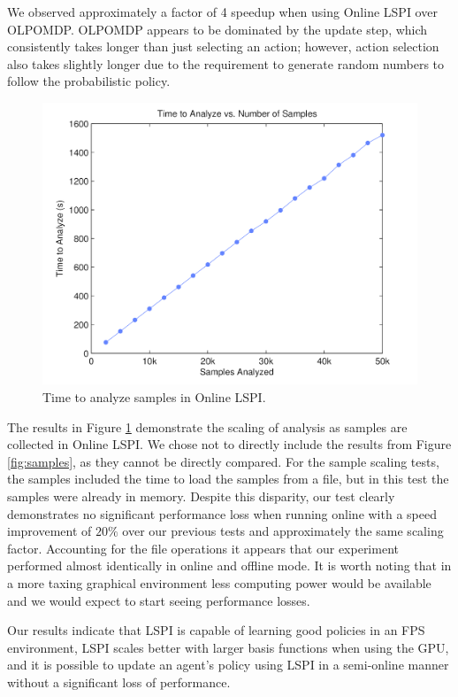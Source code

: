 We observed approximately a factor of 4 speedup when using Online LSPI over OLPOMDP. OLPOMDP appears to be dominated by the update step, which consistently takes longer than just selecting an action; however, action selection also takes slightly longer due to the requirement to generate random numbers to follow the probabilistic policy.

\begin{figure}
	\centering
		\includegraphics[height=0.33\paperheight]{Online_Time_vs_Samples.png}
	\caption{Time to analyze samples in Online LSPI.}
	\label{fig:online:samples}
\end{figure}

The results in Figure \ref{fig:online:samples} demonstrate the scaling of analysis as samples are collected in Online LSPI. We chose not to directly include the results from Figure \ref{fig:samples}, as they cannot be directly compared. For the sample scaling tests, the samples included the time to load the samples from a file, but in this test the samples were already in memory. Despite this disparity, our test clearly demonstrates no significant performance loss when running online with a speed improvement of $20\%$ over our previous tests and approximately the same scaling factor. Accounting for the file operations it appears that our experiment performed almost identically in online and offline mode. It is worth noting that in a more taxing graphical environment less computing power would be available and we would expect to start seeing performance losses.

Our results indicate that LSPI is capable of learning good policies in an FPS environment, LSPI scales better with larger basis functions when using the GPU, and it is possible to update an agent's policy using LSPI in a semi-online manner without a significant loss of performance.